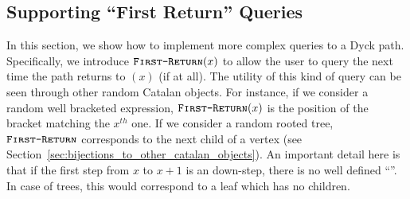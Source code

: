 \subsection{Supporting ``First Return'' Queries}%
\label{sec:supporting_first_return_queries}

In this section, we show how to implement more complex queries to a Dyck path.
Specifically, we introduce $\texttt{\textsc{First-Return}}(x)$ to allow the user to query the next time the path returns to $(x)$ (if at all).
The utility of this kind of query can be seen through other random Catalan objects.
For instance, if we consider a random well bracketed expression, $\texttt{\textsc{First-Return}}(x)$ is the position of the bracket matching the $x^{th}$ one.
If we consider a random rooted tree,
$\texttt{\textsc{First-Return}}$ corresponds to the next child of a vertex (see Section~\ref{sec:bijections_to_other_catalan_objects}).
An important detail here is that if the first step from $x$ to $x+1$ is an down-step, there is no well defined ``''.
In case of trees, this would correspond to a leaf which has no children.




